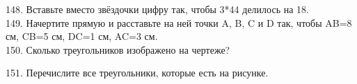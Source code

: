 \documentclass[12pt]{article}
\begin{document}
148. Вставьте вместо звёздочки цифру так, чтобы 3*44 делилось на 18.\\
149. Начертите прямую и расставьте на ней точки A, B, C и D так, чтобы AB=8 см, CB=5 см, DC=1 см, AC=3 см.\\
150. Сколько треугольников изображено на чертеже?
\begin{center}
\begin{figure}[ht!]
\end{figure}
\end{center}
151. Перечислите все треугольники, которые есть на рисунке.
\begin{center}
\begin{figure}[ht!]
\end{figure}
\end{center}
\end{document}
